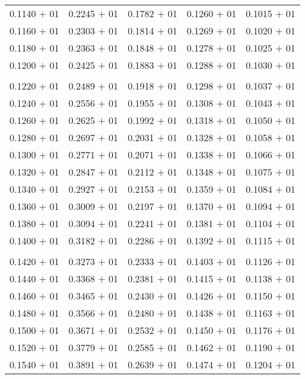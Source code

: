 \documentclass[a4paper,11pt]{article}
\begin{document}
\begin{center}
\begin{longtable}{ c c c c c }
0.1140 $+$ 01 & 0.2245 $+$ 01 & 0.1782 $+$ 01 & 0.1260 $+$ 01 & 0.1015 $+$ 01 \\
0.1160 $+$ 01 & 0.2303 $+$ 01 & 0.1814 $+$ 01 & 0.1269 $+$ 01 & 0.1020 $+$ 01 \\
0.1180 $+$ 01 & 0.2363 $+$ 01 & 0.1848 $+$ 01 & 0.1278 $+$ 01 & 0.1025 $+$ 01 \\
0.1200 $+$ 01 & 0.2425 $+$ 01 & 0.1883 $+$ 01 & 0.1288 $+$ 01 & 0.1030 $+$ 01 \\
\\
0.1220 $+$ 01 & 0.2489 $+$ 01 & 0.1918 $+$ 01 & 0.1298 $+$ 01 & 0.1037 $+$ 01 \\
0.1240 $+$ 01 & 0.2556 $+$ 01 & 0.1955 $+$ 01 & 0.1308 $+$ 01 & 0.1043 $+$ 01 \\
0.1260 $+$ 01 & 0.2625 $+$ 01 & 0.1992 $+$ 01 & 0.1318 $+$ 01 & 0.1050 $+$ 01 \\
0.1280 $+$ 01 & 0.2697 $+$ 01 & 0.2031 $+$ 01 & 0.1328 $+$ 01 & 0.1058 $+$ 01 \\
0.1300 $+$ 01 & 0.2771 $+$ 01 & 0.2071 $+$ 01 & 0.1338 $+$ 01 & 0.1066 $+$ 01 \\
0.1320 $+$ 01 & 0.2847 $+$ 01 & 0.2112 $+$ 01 & 0.1348 $+$ 01 & 0.1075 $+$ 01 \\
0.1340 $+$ 01 & 0.2927 $+$ 01 & 0.2153 $+$ 01 & 0.1359 $+$ 01 & 0.1084 $+$ 01 \\
0.1360 $+$ 01 & 0.3009 $+$ 01 & 0.2197 $+$ 01 & 0.1370 $+$ 01 & 0.1094 $+$ 01 \\
0.1380 $+$ 01 & 0.3094 $+$ 01 & 0.2241 $+$ 01 & 0.1381 $+$ 01 & 0.1104 $+$ 01 \\
0.1400 $+$ 01 & 0.3182 $+$ 01 & 0.2286 $+$ 01 & 0.1392 $+$ 01 & 0.1115 $+$ 01 \\
\\
0.1420 $+$ 01 & 0.3273 $+$ 01 & 0.2333 $+$ 01 & 0.1403 $+$ 01 & 0.1126 $+$ 01 \\
0.1440 $+$ 01 & 0.3368 $+$ 01 & 0.2381 $+$ 01 & 0.1415 $+$ 01 & 0.1138 $+$ 01 \\
0.1460 $+$ 01 & 0.3465 $+$ 01 & 0.2430 $+$ 01 & 0.1426 $+$ 01 & 0.1150 $+$ 01 \\
0.1480 $+$ 01 & 0.3566 $+$ 01 & 0.2480 $+$ 01 & 0.1438 $+$ 01 & 0.1163 $+$ 01 \\
0.1500 $+$ 01 & 0.3671 $+$ 01 & 0.2532 $+$ 01 & 0.1450 $+$ 01 & 0.1176 $+$ 01 \\
0.1520 $+$ 01 & 0.3779 $+$ 01 & 0.2585 $+$ 01 & 0.1462 $+$ 01 & 0.1190 $+$ 01 \\
0.1540 $+$ 01 & 0.3891 $+$ 01 & 0.2639 $+$ 01 & 0.1474 $+$ 01 & 0.1204 $+$ 01 \\

\end{longtable}
\end{center}
\end{document}
